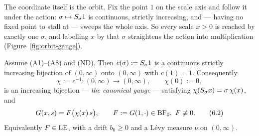 The coordinate itself is the orbit. Fix the point $1$ on the scale axis and follow it under the
action: $\sigma \mapsto S_\sigma 1$ is continuous, strictly increasing, and --- having no
fixed point to stall at --- sweeps the whole axis. So every scale $x > 0$ is reached by exactly
one $\sigma$, and labelling $x$ by that $\sigma$ straightens the action into multiplication
(Figure~\ref{fig:orbit-gauge}).



\begin{proposition}\label{prop:canonical-gauge}
Assume (A1)--(A8) and (ND). Then $c(\sigma) := S_\sigma 1$ is a continuous strictly
increasing bijection of $(0,\infty)$ onto $(0,\infty)$ with $c(1) = 1$. Consequently
\[
  \chi := c^{-1} : (0,\infty) \to (0,\infty), \qquad \chi(0) := 0,
\]
is an increasing bijection --- \emph{the canonical gauge} --- satisfying
$\chi(S_\sigma x) = \sigma\,\chi(x)$, and
\[
  G(x, s) = F\bigl(\chi(x)\, s\bigr), \qquad
  F := G(1, \cdot) \in \mathrm{BF}_0,\ F \not\equiv 0. \tag{6.2}
\]
Equivalently $F \in \mathrm{LE}$, with a drift $b_0 \ge 0$ and a Lévy measure $\nu$ on $(0,\infty)$.
\end{proposition}

